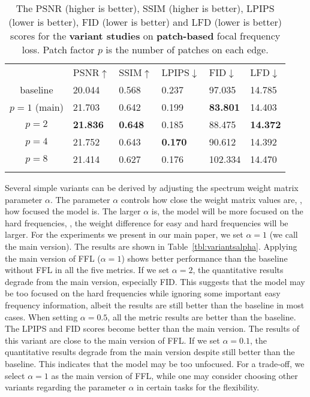 \documentclass[10pt,twocolumn,letterpaper]{article}
\begin{document}
\begin{table}[tb!]
\centering
\footnotesize
\caption{The PSNR (higher is better), SSIM (higher is better), LPIPS (lower is better), FID (lower is better) and LFD (lower is better) scores for the \textbf{variant studies} on \textbf{patch-based} focal frequency loss. Patch factor $p$ is the number of patches on each edge.}
\begin{tabularx}{\linewidth}{c|*{5}{|Y}}
\Xhline{1pt}
 & PSNR$\uparrow$& SSIM$\uparrow$& LPIPS$\downarrow$& FID$\downarrow$& LFD$\downarrow$ \\
\Xhline{0.6pt}
baseline & 20.044& 0.568& 0.237& 97.035& 14.785 \\
\Xhline{0.4pt}
$p=1$ (main) & 21.703& 0.642& 0.199& {\bf83.801}& 14.403 \\
$p=2$ & {\bf21.836}& {\bf0.648}& 0.185& 88.475& {\bf14.372} \\
$p=4$ & 21.752& 0.643& {\bf0.170}& 90.612& 14.392 \\
$p=8$ & 21.414& 0.627& 0.176& 102.334& 14.470 \\
\Xhline{1pt}
\end{tabularx}
\label{tbl:variantspatch}
\vspace{-0.2cm}
\end{table}


Several simple variants can be derived by adjusting the spectrum weight matrix parameter $\alpha$. The parameter $\alpha$ controls how close the weight matrix values are, \ie, how focused the model is. The larger $\alpha$ is, the model will be more focused on the hard frequencies, \ie, the weight difference for easy and hard frequencies will be larger. For the experiments we present in our main paper, we set $\alpha=1$ (we call the main version).
The results are shown in Table~\ref{tbl:variantsalpha}.
Applying the main version of FFL ($\alpha=1$) shows better performance than the baseline without FFL in all the five metrics.
If we set $\alpha=2$, the quantitative results degrade from the main version, especially FID. This suggests that the model may be too focused on the hard frequencies while ignoring some important easy frequency information, albeit the results are still better than the baseline in most cases.
When setting $\alpha=0.5$, all the metric results are better than the baseline. The LPIPS and FID scores become better than the main version. The results of this variant are close to the main version of FFL.
If we set $\alpha=0.1$, the quantitative results degrade from the main version despite still better than the baseline. This indicates that the model may be too unfocused.
For a trade-off, we select $\alpha=1$ as the main version of FFL, while one may consider choosing other variants regarding the parameter $\alpha$ in certain tasks for the flexibility.
\end{document}
